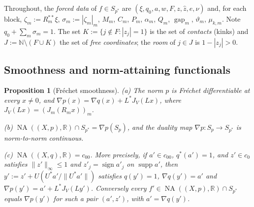 \documentclass[10pt]{amsart}
\newtheorem{proposition}[theorem]{Proposition}
\theoremstyle{definition}
\theoremstyle{remark}
\newcommand{\NA}{\operatorname{NA}}
\newcommand{\supp}{\operatorname{supp}}
\newcommand{\sgn}{\operatorname{sign}}
\newcommand{\R}{\mathbb R}
\newcommand{\N}{\mathbb N}
\newcommand{\gap}{\operatorname{gap}}
\newcommand{\zh}{\hat z}
\begin{document}
Throughout, the \emph{forced data} of $f\in S_{p^*}$ are
$(\xi,q_0,a,w,F,z,\zh,e,\nu)$ and, for each block,
$\zeta_m:=R_m^{**}\xi$, $\sigma_m:=|\zeta_m|_m$, $M_m$, $C_m$, $P_m$,
$\alpha_m$, $Q_m$, $\gap_m$, $\vartheta_m$, $\mu_{k,m}$.  Note
$q_0+\sum_m\sigma_m=1$.  The set $K:=\{j\notin F:|z_j|=1\}$ is the set of
\emph{contacts} (kinks) and $J:=\N\setminus(F\cup K)$ the set of
\emph{free coordinates}; the \emph{room} of $j\in J$ is $1-|z_j|>0$.

\subsection{Smoothness and norm-attaining functionals}

\begin{proposition}[Fr\'echet smoothness]\label{prop:smooth}
\textup{(a)} The norm $p$ is Fr\'echet differentiable at every $x\neq0$,
and $\nabla p(x)=\nabla q(x)+L^*J_V(Lx)$, where $J_V(Lx)=(J_m(R_mx))_m$.

\textup{(b)} $\NA((X,p),\R)\cap S_{p^*}=\nabla p(S_p)$, and the duality map
$\nabla p:S_p\to S_{p^*}$ is norm-to-norm continuous.

\textup{(c)} $\NA((X,q),\R)=c_{00}$.  More precisely, if $a'\in c_{00}$,
$q^*(a')=1$, and $z'\in c_0$ satisfies $\|z'\|_\infty\le1$ and
$z'_j=\sgn a'_j$ on $\supp a'$, then $y':=z'+U(U^*a'/\|U^*a'\|)$ satisfies
$q(y')=1$, $\nabla q(y')=a'$ and $\nabla p(y')=a'+L^*J_V(Ly')$.
Conversely every $f'\in\NA((X,p),\R)\cap S_{p^*}$ equals $\nabla p(y')$ for
such a pair $(a',z')$, with $a'=\nabla q(y')$.
\end{proposition}
\end{document}
